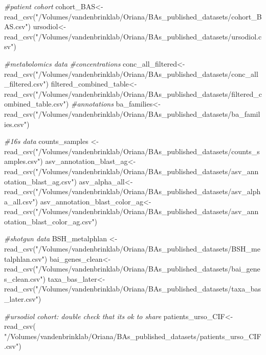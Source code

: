 \documentclass[
]{book}
\newenvironment{Shaded}{\begin{snugshade}}{\end{snugshade}}
\newcommand{\CommentTok}[1]{\textcolor[rgb]{0.56,0.35,0.01}{\textit{#1}}}
\newcommand{\FunctionTok}[1]{\textcolor[rgb]{0.00,0.00,0.00}{#1}}
\newcommand{\NormalTok}[1]{#1}
\newcommand{\OtherTok}[1]{\textcolor[rgb]{0.56,0.35,0.01}{#1}}
\newcommand{\StringTok}[1]{\textcolor[rgb]{0.31,0.60,0.02}{#1}}
\begin{document}
\begin{Shaded}
\begin{Highlighting}[]
\CommentTok{\#patient cohort}
\NormalTok{cohort\_BAS}\OtherTok{\textless{}{-}}\FunctionTok{read\_csv}\NormalTok{(}\StringTok{"/Volumes/vandenbrinklab/Oriana/BAs\_published\_datasets/cohort\_BAS.csv"}\NormalTok{)}
\NormalTok{ursodiol}\OtherTok{\textless{}{-}}\FunctionTok{read\_csv}\NormalTok{(}\StringTok{"/Volumes/vandenbrinklab/Oriana/BAs\_published\_datasets/ursodiol.csv"}\NormalTok{)}

\CommentTok{\#metabolomics data}
\CommentTok{\#concentrations}
\NormalTok{conc\_all\_filtered}\OtherTok{\textless{}{-}}\FunctionTok{read\_csv}\NormalTok{(}\StringTok{"/Volumes/vandenbrinklab/Oriana/BAs\_published\_datasets/conc\_all\_filtered.csv"}\NormalTok{)}
\NormalTok{filtered\_combined\_table}\OtherTok{\textless{}{-}}\FunctionTok{read\_csv}\NormalTok{(}\StringTok{"/Volumes/vandenbrinklab/Oriana/BAs\_published\_datasets/filtered\_combined\_table.csv"}\NormalTok{)}
\CommentTok{\#annotations}
\NormalTok{ba\_families}\OtherTok{\textless{}{-}}\FunctionTok{read\_csv}\NormalTok{(}\StringTok{"/Volumes/vandenbrinklab/Oriana/BAs\_published\_datasets/ba\_families.csv"}\NormalTok{)}

\CommentTok{\#16s data}
\NormalTok{counts\_samples }\OtherTok{\textless{}{-}}\FunctionTok{read\_csv}\NormalTok{(}\StringTok{"/Volumes/vandenbrinklab/Oriana/BAs\_published\_datasets/counts\_samples.csv"}\NormalTok{)}
\NormalTok{asv\_annotation\_blast\_ag}\OtherTok{\textless{}{-}}\FunctionTok{read\_csv}\NormalTok{(}\StringTok{"/Volumes/vandenbrinklab/Oriana/BAs\_published\_datasets/asv\_annotation\_blast\_ag.csv"}\NormalTok{)}
\NormalTok{asv\_alpha\_all}\OtherTok{\textless{}{-}}\FunctionTok{read\_csv}\NormalTok{(}\StringTok{"/Volumes/vandenbrinklab/Oriana/BAs\_published\_datasets/asv\_alpha\_all.csv"}\NormalTok{)}
\NormalTok{asv\_annotation\_blast\_color\_ag}\OtherTok{\textless{}{-}}\FunctionTok{read\_csv}\NormalTok{(}\StringTok{"/Volumes/vandenbrinklab/Oriana/BAs\_published\_datasets/asv\_annotation\_blast\_color\_ag.csv"}\NormalTok{)}

\CommentTok{\#shotgun data}
\NormalTok{BSH\_metalphlan }\OtherTok{\textless{}{-}}\FunctionTok{read\_csv}\NormalTok{(}\StringTok{"/Volumes/vandenbrinklab/Oriana/BAs\_published\_datasets/BSH\_metalphlan.csv"}\NormalTok{)}
\NormalTok{bai\_genes\_clean}\OtherTok{\textless{}{-}}\FunctionTok{read\_csv}\NormalTok{(}\StringTok{"/Volumes/vandenbrinklab/Oriana/BAs\_published\_datasets/bai\_genes\_clean.csv"}\NormalTok{)}
\NormalTok{taxa\_bas\_later}\OtherTok{\textless{}{-}}\FunctionTok{read\_csv}\NormalTok{(}\StringTok{"/Volumes/vandenbrinklab/Oriana/BAs\_published\_datasets/taxa\_bas\_later.csv"}\NormalTok{)}

\CommentTok{\#ursodiol cohort: double check that it\textquotesingle{}s ok to share}
\NormalTok{patients\_urso\_CIF}\OtherTok{\textless{}{-}} \FunctionTok{read\_csv}\NormalTok{( }\StringTok{"/Volumes/vandenbrinklab/Oriana/BAs\_published\_datasets/patients\_urso\_CIF.csv"}\NormalTok{)}
\end{Highlighting}
\end{Shaded}
\end{document}
